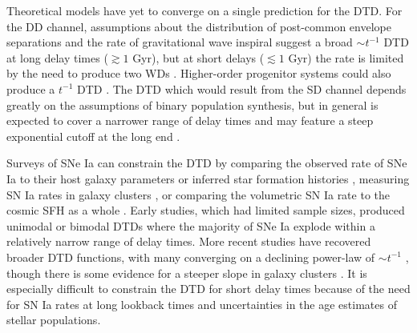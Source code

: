 \documentclass[twocolumn,twocolappendix,linenumbers,trackchanges]{aastex631}
\begin{document}
Theoretical models have yet to converge on a single prediction for the DTD.
For the DD channel, assumptions about the distribution of post-common envelope separations and the rate of gravitational wave inspiral suggest a broad $\sim t^{-1}$ DTD at long delay times ($\gtrsim 1$ Gyr), but at short delays ($\lesssim 1$ Gyr) the rate is limited by the need to produce two WDs \citep[see Section 3.5 from][]{Maoz2014-Review}.
Higher-order progenitor systems could also produce a $t^{-1}$ DTD \citep{Fang2018-QuadrupleSystems,Rajamuthukumar2023-TripleEvolution}.
The DTD which would result from the SD channel depends greatly on the assumptions of binary population synthesis, but in general is expected to cover a narrower range of delay times and may feature a steep exponential cutoff at the long end \citep[e.g.,][]{Greggio2005-AnalyticalRates}.

Surveys of SNe Ia 
can constrain the DTD
by comparing the observed rate of SNe Ia to their host galaxy parameters \citep[e.g.,][]{Mannucci2005-SNRate,Heringer2019-FieldGalaxyDTD} or inferred star formation histories \citep[SFHs; e.g.,][]{Maoz2012-SloanIIDTD}, measuring SN Ia rates in galaxy clusters \citep[e.g.,][]{Maoz2010-ClusterDTD}, or comparing the volumetric SN Ia rate to the cosmic SFH as a whole \citep[e.g.,][]{Graur2014-VolumetricSNIaRates,Strolger2020-ExponentialDTD}. 
Early studies, which had limited sample sizes, produced unimodal \citep{Strolger2004-SNIaProgenitors} or bimodal \citep{Mannucci2006-TwoPopulations} DTDs where the majority of SNe Ia explode within a relatively narrow range of delay times.
More recent studies have recovered broader DTD functions, with many converging on a declining power-law of $\sim t^{-1}$ \citep[e.g.,][]{Maoz2017-CosmicDTD,Castrillo2021-DTD,Wiseman2021-DESRates}, though there is some evidence for a steeper slope in galaxy clusters \citep{Maoz2017-CosmicDTD,FriedmannMaoz2018-ClusterDTD}.
It is especially difficult to constrain the DTD for short delay times \citep{MaozMannucci2012-SNeIaReview} because of the need for SN Ia rates at long lookback times and uncertainties in the age estimates of stellar populations.
\end{document}
